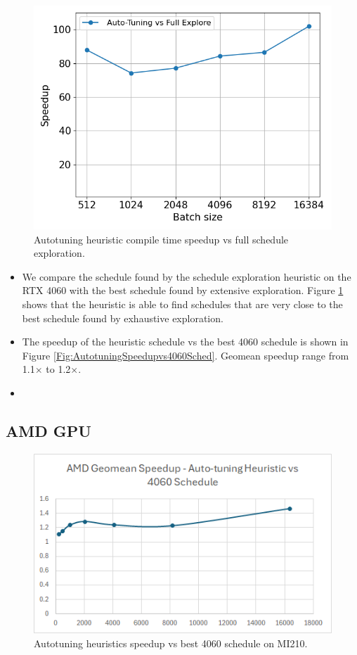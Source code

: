 \begin{figure}[htb]
  \centering
  \includegraphics[width=0.75\linewidth]{figures/geomean_speedup_4060_full_exp_vs_at.png}
  \caption{Autotuning heuristic compile time speedup vs full schedule exploration.}
  \label{Fig:HeuristicVsFullExplore_Speedup}
\end{figure}

\begin{itemize}
  \item We compare the schedule found by the schedule exploration heuristic on the RTX 4060 with the best schedule found by
  extensive exploration. Figure \ref{Fig:HeuristicVsFullExplore_Speedup} shows that the heuristic is able to find schedules that are
  very close to the best schedule found by exhaustive exploration.
  \item The speedup of the heuristic schedule vs the best 4060 schedule is shown in Figure \ref{Fig:AutotuningSpeedupvs4060Sched}.
  Geomean speedup range from 1.1$\times$ to 1.2$\times$.
  \item 
\end{itemize}

\subsection{AMD GPU}
\begin{figure}[htb]
  \centering
  \includegraphics[width=0.75\linewidth]{figures/AMD_MI210_ATHeuristicVs4060Sched_speedup.png}
  \caption{Autotuning heuristics speedup vs best 4060 schedule on MI210.}
  \label{Fig:AMD_MI210_ATHeuristicVs4060Sched_speedup}
\end{figure}

